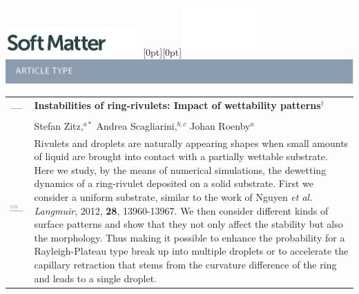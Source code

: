 \documentclass[twoside,twocolumn,9pt]{article}
\begin{document}
  \begin{@twocolumnfalse}
{\includegraphics[height=30pt]{head_foot/SM}\hfill\raisebox{0pt}[0pt][0pt]{\includegraphics[height=55pt]{head_foot/RSC_LOGO_CMYK}}\\[1ex]
\includegraphics[width=18.5cm]{head_foot/header_bar}}\par
\vspace{1em}
\sffamily
\begin{tabular}{m{4.5cm} p{13.5cm} }

\includegraphics{head_foot/DOI} & \noindent\LARGE{\textbf{Instabilities of ring-rivulets: Impact of wettability patterns$^\dag$}} \\%
\vspace{0.3cm} & \vspace{0.3cm} \\

 & \noindent\large{Stefan Zitz,\textit{$^{a\ast}$} Andrea Scagliarini,\textit{$^{b,c}$} Johan Roenby\textit{$^{a}$}} \\%

\includegraphics{head_foot/dates} & \noindent\normalsize{
Rivulets and droplets are naturally appearing shapes when small amounts of liquid are brought into contact with a partially wettable substrate.
Here we study, by the means of numerical simulations, the dewetting dynamics of a ring-rivulet deposited on a solid substrate.
First we consider a uniform substrate, similar to the work of Nguyen \textit{et al. Langmuir}, 2012, \textbf{28}, 13960-13967.
We then consider different kinds of surface patterns and show that they not only affect the stability but also the morphology.
Thus making it possible to enhance the probability for a Rayleigh-Plateau type break up into multiple droplets or to accelerate the capillary retraction that stems from the curvature difference of the ring and leads to a single droplet.
}


\end{tabular}
\end{@twocolumnfalse}
\end{document}
